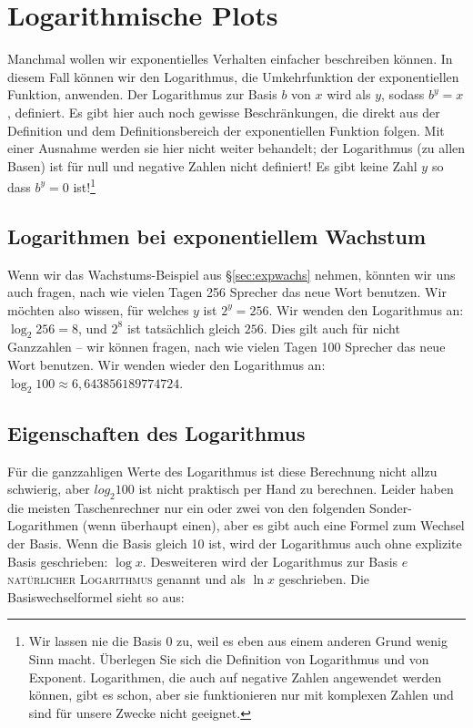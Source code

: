 \documentclass[a4paper,12pt,oneside,leqno]{scrartcl}%
\newcommand{\terminus}[1]{\textsc{#1}}
\newcommand{\sep}{,\!}
\begin{document}
 \pagebreak
\section{Logarithmische Plots}

Manchmal wollen wir exponentielles Verhalten einfacher beschreiben können. 
In diesem Fall können wir den Logarithmus, die Umkehrfunktion der exponentiellen Funktion, anwenden.  
Der Logarithmus zur Basis $b$ von $x$ wird als $y$, sodass $b^{y}=x$, definiert. 
Es gibt hier auch noch gewisse Beschränkungen, die direkt aus der Definition und dem Definitionsbereich der exponentiellen Funktion folgen.  
Mit einer Ausnahme werden sie hier nicht weiter behandelt; der Logarithmus (zu allen Basen) ist für null und negative Zahlen nicht definiert!  
Es gibt keine Zahl $y$ so dass $b^{y}=0$ ist!\footnote{Wir lassen nie die Basis 0 zu, weil es eben aus einem anderen Grund wenig Sinn macht. Überlegen Sie sich die Definition von Logarithmus und von Exponent.  Logarithmen, die auch auf negative Zahlen angewendet werden können, gibt es schon, aber sie funktionieren nur mit komplexen Zahlen und sind für unsere Zwecke nicht geeignet.}

\subsection{Logarithmen bei exponentiellem Wachstum}
Wenn wir das Wachstums-Beispiel aus \S\ref{sec:expwachs} nehmen, könnten wir uns auch fragen, nach wie vielen Tagen 256 Sprecher das neue Wort benutzen.  
Wir möchten also wissen, für welches $y$ ist $2^{y}=256$.  
Wir wenden den Logarithmus an: $\log_{2}256=8$, und $2^{8}$ ist tatsächlich gleich $256$. 
Dies gilt auch für nicht Ganzzahlen --  wir können fragen, nach wie vielen Tagen 100 Sprecher das neue Wort benutzen. 
Wir wenden wieder den Logarithmus an: $\log_{2}100\approx{}6\sep{}643856189774724$.  

\subsection{Eigenschaften des Logarithmus}
Für die ganzzahligen Werte des Logarithmus ist diese Berechnung nicht allzu schwierig, aber $log_{2}100$ ist nicht praktisch per Hand zu berechnen.  Leider haben die meisten Taschenrechner nur ein oder zwei von den folgenden Sonder-Logarithmen (wenn überhaupt einen), aber es gibt auch eine Formel zum Wechsel der Basis. 
Wenn die Basis gleich 10 ist, wird der Logarithmus auch ohne explizite Basis geschrieben: $\log x$.  Desweiteren wird der Logarithmus zur Basis $e$  \terminus{natürlicher Logarithmus} genannt und als $\ln x$ geschrieben.   Die Basiswechselformel sieht so aus: 
\end{document}
